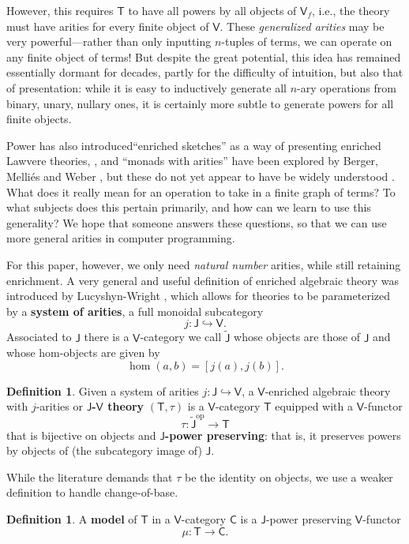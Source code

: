 \documentclass{amsart}
\theoremstyle{definition}
\newtheorem{definition}[theorem]{Definition}
\newcommand{\V}{\mathsf{V}}
\newcommand{\C}{\mathsf{C}}
\newcommand{\J}{\mathsf{J}}
\newcommand{\T}{\mathsf{T}}
\newcommand{\op}{\mathrm{op}}
\newcommand{\maps}{\colon}
\begin{document}
However, this requires $\T$ to have all powers by all objects of $\V_f$, i.e., the theory must have arities for every finite object of $\V$.  These \textit{generalized arities} may be very powerful---rather than only inputting $n$-tuples of terms, we can operate on any finite object of terms! But despite the great potential, this idea has remained essentially dormant for decades, partly for the difficulty of intuition, but also that of presentation: while it is easy to inductively generate all $n$-ary operations from binary, unary, nullary ones, it is certainly more subtle to generate powers for all finite objects.

Power has also introduced``enriched sketches'' as a way of presenting enriched Lawvere theories, \cite{powsketch}, and ``monads with arities'' have been explored by Berger, Melli\'es and Weber \cite{bergermelliesweber}, but these do not yet appear to have be  widely understood . What does it really mean for an operation to take in a finite graph of terms? To what subjects does this pertain primarily, and how can we learn to use this generality? We hope that someone answers these questions, so that we can use more general arities in computer programming.

For this paper, however, we only need \textit{natural number} arities, while still retaining enrichment. A very general and useful definition of enriched algebraic theory was introduced by Lucyshyn-Wright \cite{rbb}, which allows for theories to be parameterized by a \textbf{system of arities}, a full monoidal subcategory 
\[ j\maps \J \hookrightarrow \V. \]
Associated to $\J$ there is a $\V$-category we call $\tilde{\J}$ whose objects are
those of $\J$ and whose hom-objects are given by
\[         \hom(a,b) = [j(a), j(b)]   .\]

\begin{definition}
Given a system of arities $j \maps \J \hookrightarrow \V$, a $\V$-enriched algebraic theory with $j$-arities or \textbf{$\J$-$\V$ theory} $(\T,\tau)$ is a $\V$-category $\T$ equipped with a $\V$-functor 
\[ \tau\maps\tilde{\J}^\op \to \T \]
that is bijective on objects and \textbf{$\J$-power preserving}: that is, it preserves powers by objects of (the subcategory image of) $\J$. 
\end{definition}
\noindent
While the literature demands that $\tau$ be the identity on objects, we use a weaker definition to handle change-of-base.

\begin{definition}
A \textbf{model} of $\T$ in a $\V$-category $\C$ is a $\J$-power preserving $\V$-functor 
\[  \mu \maps \T \to \C.\]
\end{definition}
\end{document}
